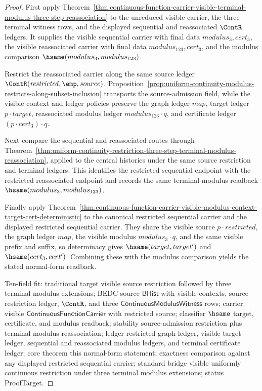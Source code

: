 \begin{proof}
First apply Theorem~\ref{thm:continuous-function-carrier-visible-terminal-modulus-three-step-reassociation} to the unreduced visible carrier, the three terminal witness rows, and the displayed sequential and reassociated $\ContR$ ledgers. It supplies the visible sequential carrier with final data $modulus_3,cert_3$, the visible reassociated carrier with final data $modulus_{123},cert_3$, and the modulus comparison $\hsame(modulus_3,modulus_{123})$.

Restrict the reassociated carrier along the same source ledger $\ContR(\mathit{restricted},\emp,source)$. Proposition~\ref{prop:uniform-continuity-modulus-restricts-along-subset-inclusion} transports the source-admission field, while the visible context and ledger policies preserve the graph ledger $map$, target ledger $p\cdot target$, reassociated modulus ledger $modulus_{123}\cdot q$, and certificate ledger $(p\cdot cert_3)\cdot q$.

Next compare the sequential and reassociated routes through Theorem~\ref{thm:uniform-continuity-restriction-three-step-terminal-modulus-reassociation}, applied to the central histories under the same source restriction and terminal ledgers. This identifies the restricted sequential endpoint with the restricted reassociated endpoint and records the same terminal-modulus readback $\hsame(modulus_3,modulus_{123})$.

Finally apply Theorem~\ref{thm:continuous-function-carrier-visible-modulus-context-target-cert-deterministic} to the canonical restricted sequential carrier and the displayed restricted sequential carrier. They share the visible source $p\cdot \mathit{restricted}$, the graph ledger $map$, the visible modulus $modulus_3\cdot q$, and the same visible prefix and suffix, so determinacy gives $\hsame(target,target')$ and $\hsame(cert_3,cert')$. Combining these with the modulus comparison yields the stated normal-form readback.

Ten-field fit: traditional target visible source restriction followed by three terminal modulus extensions; BEDC source $\mathsf{BHist}$ with visible contexts, source restriction ledger, $\ContR$, and three $\mathsf{ContinuousModulusWitness}$ rows; carrier visible $\mathsf{ContinuousFunctionCarrier}$ with restricted source; classifier $\hsame$ target, certificate, and modulus readback; stability source-admission restriction plus terminal modulus reassociation; ledger restricted graph ledger, visible target ledger, sequential and reassociated modulus ledgers, and terminal certificate ledger; core theorem this normal-form statement; exactness comparison against any displayed restricted sequential carrier; standard bridge visible uniformly continuous restriction under three terminal modulus extensions; status ProofTarget.
\end{proof}

